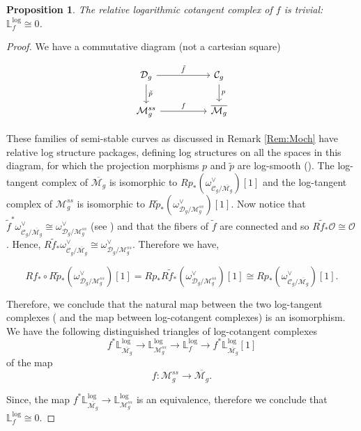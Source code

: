 \documentclass[11pt]{amsart}
\theoremstyle{plain}
\numberwithin{equation}{section}
\theoremstyle{definition}
\theoremstyle{plain}
\newtheorem{Prop}[Def]{Proposition}
\begin{document}
\begin{Prop}\label{reltan}
The relative logarithmic cotangent complex of $f$ is trivial: $\mathbb L^{\log}_{f}\cong 0$. 
\end{Prop}
\begin{proof}
We have a commutative diagram (not a cartesian square)

\begin{equation}
\begin{tikzcd}
\mathcal D_g\arrow{d}{\tilde p} \arrow{rr}{\tilde f} & & \mathcal C_g\arrow{d}{p}\\
\mathcal M^{ss}_g\arrow{rr}{f} && \overline{\mathcal M_g}  
\end{tikzcd}
\end{equation}
\vspace{1em}

These families of semi-stable curves as discussed in Remark \ref{Rem:Moch} have relative log structure packages, defining log structures on all the spaces in this diagram, for which the projection morphisms $p$ and $\tilde{p}$ are log-smooth (\cite[Theorem 2.1., and ``Gobal Construction", Page 227]{17}). The log-tangent complex of $\overline{\mathcal M_g}$ is isomorphic to $Rp_*(\omega^{\vee}_{\mathcal C_g/ \overline{\mathcal M_g}})[1]$ and the log-tangent complex of $\mathcal M^{ss}_g$ is isomorphic to $R\tilde p_*(\omega^{\vee}_{\mathcal D_g/ {\mathcal M^{ss}_g}})[1]$. Now notice that $\tilde{f}^{*}\omega^{\vee}_{\mathcal C_g/ \overline{\mathcal M_g}} \cong \omega^{\vee}_{\mathcal D_g/ {\mathcal M^{ss}_g}}$ (see \cite[Page 169]{KFF}) and that the fibers of $\tilde{f}$ are connected and so $R\tilde{f}_{*}\mathcal{O} \cong \mathcal{O}$. Hence, $R\tilde{f}_{*}\omega^{\vee}_{\mathcal C_g/ \overline{\mathcal M_g}} \cong \omega^{\vee}_{\mathcal D_g/ {\mathcal M^{ss}_g}}$. Therefore we have, 

\[Rf_*\circ R\tilde p_*(\omega^{\vee}_{\mathcal D_g/ {\mathcal M^{ss}_g}})[1]=Rp_*R\tilde f_*(\omega^{\vee}_{\mathcal D_g/ {\mathcal M^{ss}_g}})[1]\cong Rp_*(\omega^{\vee}_{\mathcal C_g/ \overline{\mathcal M_g}})[1].\] 

Therefore, we conclude that the natural map between the two log-tangent complexes ( and the map between log-cotangent complexes) is an isomorphism. We have the following distinguished triangles of log-cotangent complexes
\begin{equation}
f^*\mathbb L^{\log}_{\overline {\mathcal M_g}}\longrightarrow \mathbb L^{\log}_{{\mathcal M^{ss}_g}}\longrightarrow \mathbb L^{\log}_f\longrightarrow f^*\mathbb L^{\log}_{\overline {\mathcal M_g}}[1] 
\end{equation}
of the map \[f: \mathcal M^{ss}_g\to \overline{\mathcal M_g}.\]



Since, the map $f^*\mathbb L^{\log}_{\overline {\mathcal M_g}}\longrightarrow \mathbb L^{\log}_{{\mathcal M^{ss}_g}}$ is an equivalence, therefore we conclude that $\mathbb L^{\log}_f\cong 0$. 
\end{proof}
\end{document}

